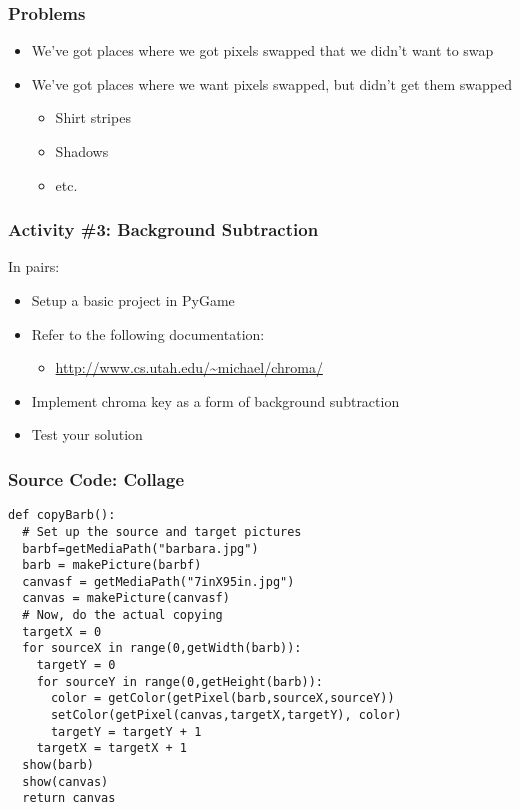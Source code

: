 

\begin{frame}
	\frametitle{Problems}
	
	\begin{itemize}		
		\item We've got places where we got pixels swapped that we didn't want to swap
		\item We've got places where we want pixels swapped, but didn't get them swapped
		\begin{itemize}
			\item Shirt stripes
			\item Shadows
			\item etc.
		\end{itemize}	
	\end{itemize}
\end{frame}

\begin{frame}
	\frametitle{Activity \#3: Background Subtraction}
	
	In pairs:
	
	\vspace{2em}
	
	\begin{itemize}		
		\item Setup a basic project in PyGame
		\item Refer to the following documentation:
		\begin{itemize}
			\item \url{http://www.cs.utah.edu/~michael/chroma/}
		\end{itemize}
		\item Implement chroma key as a form of background subtraction
		\item Test your solution
	\end{itemize}
\end{frame}

\begin{frame}[fragile]
	\frametitle{Source Code: Collage}
	
\begin{lstlisting}
def copyBarb():
  # Set up the source and target pictures
  barbf=getMediaPath("barbara.jpg")
  barb = makePicture(barbf)
  canvasf = getMediaPath("7inX95in.jpg")
  canvas = makePicture(canvasf)
  # Now, do the actual copying
  targetX = 0
  for sourceX in range(0,getWidth(barb)):
    targetY = 0
    for sourceY in range(0,getHeight(barb)):
      color = getColor(getPixel(barb,sourceX,sourceY))
      setColor(getPixel(canvas,targetX,targetY), color)
      targetY = targetY + 1
    targetX = targetX + 1
  show(barb)
  show(canvas)
  return canvas
\end{lstlisting}

\end{frame}

